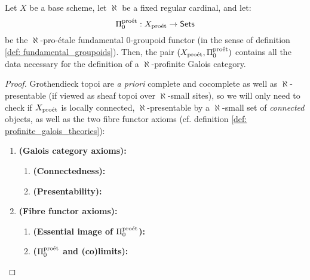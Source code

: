                     \begin{theorem} \label{theorem: profinite_galois_theories}
                        Let $X$ be a base scheme, let $\aleph$ be a fixed regular cardinal, and let:
                            $$\Pi_0^{\mathrm{pro\acute{e}t}}: X_{\mathrm{pro\acute{e}t}} \to \mathsf{Sets}$$
                        be the $\aleph$-pro-\'etale fundamental $0$-groupoid functor (in the sense of definition \ref{def: fundamental_groupoids}). Then, the pair $(X_{\mathrm{pro\acute{e}t}}, \Pi_0^{\mathrm{pro\acute{e}t}})$ contains all the data necessary for the definition of a $\aleph$-profinite Galois category.
                    \end{theorem}
                        \begin{proof}
                            Grothendieck topoi are \textit{a priori} complete and cocomplete as well as $\aleph$-presentable (if viewed as sheaf topoi over $\aleph$-small sites), so we will only need to check if $X_{\mathrm{pro\acute{e}t}}$ is locally connected, $\aleph$-presentable by a $\aleph$-small set of \textit{connected} objects, as well as the two fibre functor axioms (cf. definition \ref{def: profinite_galois_theories}):
                                \begin{enumerate}
                                    \item \textbf{(Galois category axioms):}
                                        \begin{enumerate}
                                            \item \textbf{(Connectedness):}
                                            \item \textbf{(Presentability):}
                                        \end{enumerate}
                                    \item \textbf{(Fibre functor axioms):}
                                        \begin{enumerate}
                                            \item \textbf{(Essential image of $\Pi_0^{\mathrm{pro\acute{e}t}}$):} 
                                            \item \textbf{($\Pi_0^{\mathrm{pro\acute{e}t}}$ and (co)limits):}
                                        \end{enumerate}
                                \end{enumerate}
                        \end{proof}
                        
